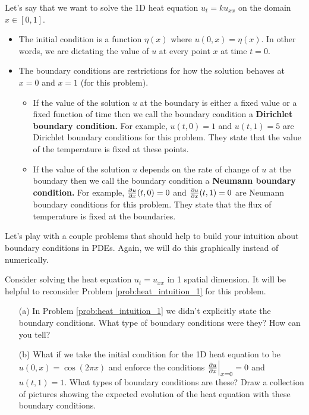 \begin{definition}
    Let's say that we want to solve the 1D heat equation $u_t = k u_{xx}$ on the domain $x
    \in [0,1]$.  
    \begin{itemize}
        \item The initial condition is a function $\eta(x)$ where $u(0,x) = \eta(x)$.  In
            other words, we are dictating the value of $u$ at every point $x$ at time
            $t=0$. 
        \item The boundary conditions are restrictions for how the solution behaves at
            $x=0$ and $x=1$ (for this problem).  
            \begin{itemize}
                \item If the value of the solution $u$ at the boundary is either a fixed value or a fixed
                    function of time then we call the boundary condition a {\bf Dirichlet
                    boundary condition.}  For example, $u(t,0) = 1$ and $u(t,1) = 5$ are
                    Dirichlet boundary conditions for this problem.  They state that the
                    value of the temperature is fixed at these points.
                \item If the value of the solution $u$ depends on the rate of change of
                    $u$ at the boundary then we call the boundary condition a {\bf Neumann
                    boundary condition.}  For example, $\frac{\partial{u}}{\partial{x}}(t,0) = 0$ and
                    $\frac{\partial{u}}{\partial{x}}(t,1) = 0$ are Neumann boundary conditions for this problem.
                    They state that the flux of temperature is fixed at the boundaries.
            \end{itemize}
            
    \end{itemize}
\end{definition}

Let's play with a couple problems that should help to build your intuition about boundary
conditions in PDEs.  Again, we will do this graphically instead of numerically.
\begin{problem}
    Consider solving the heat equation $u_t = u_{xx}$ in 1 spatial dimension.  It will
    be helpful to reconsider Problem \ref{prob:heat_intuition_1} for this problem.
    \begin{enumerate}
        \item[(a)] In Problem \ref{prob:heat_intuition_1} we didn't explicitly state the
            boundary conditions.  What type of boundary conditions were they?  How can
            you tell?
        \item[(b)] What if we take the initial condition for the 1D heat equation to be
            $u(0,x) = \cos(2\pi x)$ and enforce the conditions $\frac{\partial{u}}{\partial{x}}\Big|_{x=0} = 0$
            and $u(t,1) = 1$.
            What types of boundary conditions are these?  Draw a collection of pictures
            showing the expected evolution of the heat equation with these boundary
            conditions.
    \end{enumerate}
\end{problem}






